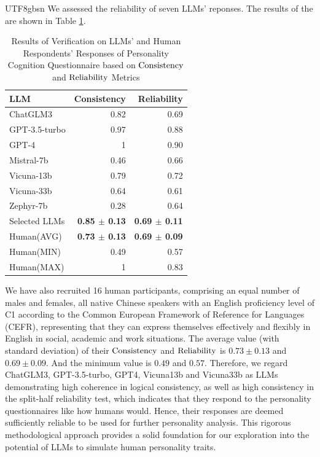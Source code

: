 \documentclass{article}
\theoremstyle{plain}
\theoremstyle{definition}
\theoremstyle{remark}
\begin{document}
\begin{CJK*}{UTF8}{gbsn}
We assessed the reliability of seven LLMs' reponses. The results of the are shown in Table \ref{table-reliability}.  

\begin{table}[t]
\caption{Results of Verification on LLMs’ and Human Respondents' Responses of Personality Cognition Questionnaire based on $\rm{Consistency}$ and $\rm{Reliability}$ Metrics}
\vskip 0.15in
\centering
\begin{tabular}{lrr}
\hline
\textbf{LLM} & \textbf{Consistency} & \textbf{Reliability}\\
\hline
ChatGLM3 & 0.82 & 0.69 \\
GPT-3.5-turbo & 0.97 & 0.88 \\
GPT-4 & 1 & 0.90 \\
Mistral-7b & 0.46 & 0.66 \\ 
Vicuna-13b & 0.79 & 0.72 \\ 
Vicuna-33b & 0.64 & 0.61 \\ 
Zephyr-7b & 0.28 & 0.64 \\ 
Selected LLMs & \bf 0.85 $\pm$ 0.13 & \bf 0.69 $\pm$ 0.11 \\ 
\hline
Human(AVG) & \bf 0.73 $\pm$ 0.13 & \bf 0.69 $\pm$ 0.09 \\
Human(MIN) & 0.49 & 0.57 \\
Human(MAX) & 1 & 0.83 \\
\hline
\end{tabular}
\label{table-reliability}
\vskip -0.1in
\end{table}


We have also recruited 16 human participants, comprising an equal number of males and females, all native Chinese speakers with an English proficiency level of C1 according to the Common European Framework of Reference for Languages (CEFR), representing that they can express themselves effectively and flexibly in English in social, academic and work situations. The average value (with standard deviation) of their $\rm{Consistency}$ and $\rm{Reliability}$ is $0.73 \pm 0.13$ and $0.69 \pm 0.09$. And the minimum value is $0.49$ and $0.57$. Therefore, we regard ChatGLM3, GPT-3.5-turbo, GPT4, Vicuna13b and Vicuna33b as LLMs demonstrating high coherence in logical consistency, as well as high consistency in the split-half reliability test, which indicates that they respond to the personality questionnaires like how humans would. Hence, their responses are deemed sufficiently reliable to be used for further personality analysis. This rigorous methodological approach provides a solid foundation for our exploration into the potential of LLMs to simulate human personality traits.




\end{CJK*}
\end{document}
